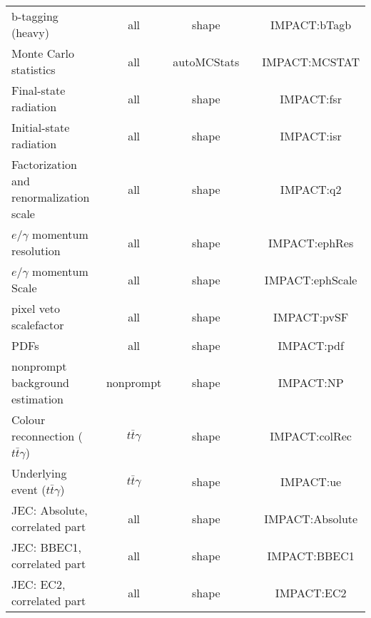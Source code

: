 \begin{table}
\begin{tabular}{l|c|c|c|c}
    b-tagging (heavy)                                   & all                   & shape             &                & IMPACT:bTagb  \\
    Monte Carlo statistics                              & all                   & autoMCStats       &                & IMPACT:MCSTAT  \\
    Final-state radiation                               & all                   & shape             &                & IMPACT:fsr  \\
    Initial-state radiation                             & all                   & shape             &                & IMPACT:isr  \\
    Factorization and renormalization scale             & all                   & shape             &                & IMPACT:q2  \\
    $e /\gamma$ momentum resolution                     & all                   & shape             &                & IMPACT:ephRes  \\
    $e /\gamma$ momentum Scale                          & all                   & shape             &                & IMPACT:ephScale  \\
    pixel veto scalefactor                              & all                   & shape             &                & IMPACT:pvSF  \\
    PDFs                                                & all                   & shape             &                & IMPACT:pdf  \\
    nonprompt background estimation                     & nonprompt             & shape             &                & IMPACT:NP  \\
    Colour reconnection ($t\bar{t}\gamma$)              & $t\bar{t}\gamma$      & shape             &                & IMPACT:colRec  \\
    Underlying event ($t\bar{t}\gamma$)                 & $t\bar{t}\gamma$      & shape             &                & IMPACT:ue  \\
    JEC: Absolute, correlated part                      & all                   & shape             &                & IMPACT:Absolute  \\
    JEC: BBEC1, correlated part                         & all                   & shape             &                & IMPACT:BBEC1  \\
    JEC: EC2, correlated part                           & all                   & shape             &                & IMPACT:EC2  \\

\end{tabular}
\end{table}
